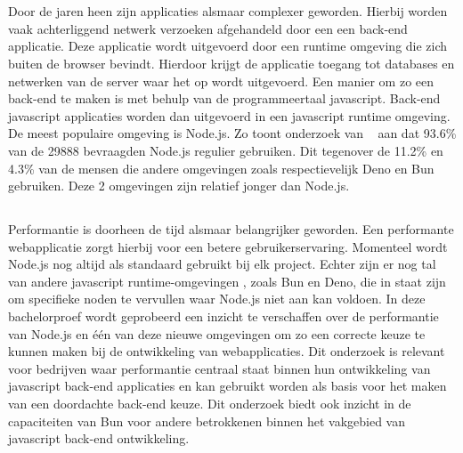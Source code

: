 
\chapter{}%
\label{ch:inleiding}


Door de jaren heen zijn applicaties alsmaar complexer geworden. Hierbij worden vaak achterliggend netwerk verzoeken afgehandeld door een 
een back-end applicatie. Deze applicatie wordt uitgevoerd door een runtime omgeving die zich buiten de browser bevindt.
Hierdoor krijgt de applicatie toegang tot databases en netwerken van de server waar het op wordt uitgevoerd.
Een manier om zo een back-end te maken is met behulp van de programmeertaal javascript. 
Back-end javascript applicaties worden dan uitgevoerd in een javascript runtime omgeving.
De meest populaire omgeving is Node.js. Zo toont onderzoek van ~\textcite{Greif2022} aan dat 93.6\% van de 29888 bevraagden Node.js 
regulier gebruiken.
Dit tegenover de 11.2\% en 4.3\% van de mensen die andere omgevingen zoals respectievelijk Deno en Bun gebruiken.
Deze 2 omgevingen zijn relatief jonger dan Node.js.

\section{}%
\label{sec:probleemstelling}

Performantie is doorheen de tijd alsmaar belangrijker geworden. 
Een performante webapplicatie zorgt hierbij voor een betere gebruikerservaring. 
Momenteel wordt Node.js nog altijd als standaard gebruikt bij elk project. Echter zijn er nog tal van andere javascript runtime-omgevingen
, zoals Bun en Deno, die in staat zijn om specifieke noden te vervullen waar Node.js niet aan kan voldoen. In deze bachelorproef wordt geprobeerd 
een inzicht te verschaffen over de performantie van Node.js en één van deze nieuwe omgevingen
om zo een correcte keuze te kunnen maken bij de ontwikkeling van webapplicaties.
Dit onderzoek is relevant voor bedrijven waar performantie centraal staat binnen hun ontwikkeling van javascript back-end applicaties en kan gebruikt worden als basis 
voor het maken van een doordachte back-end keuze. Dit onderzoek 
biedt ook inzicht in de capaciteiten van Bun voor andere betrokkenen binnen het vakgebied van javascript back-end ontwikkeling.

